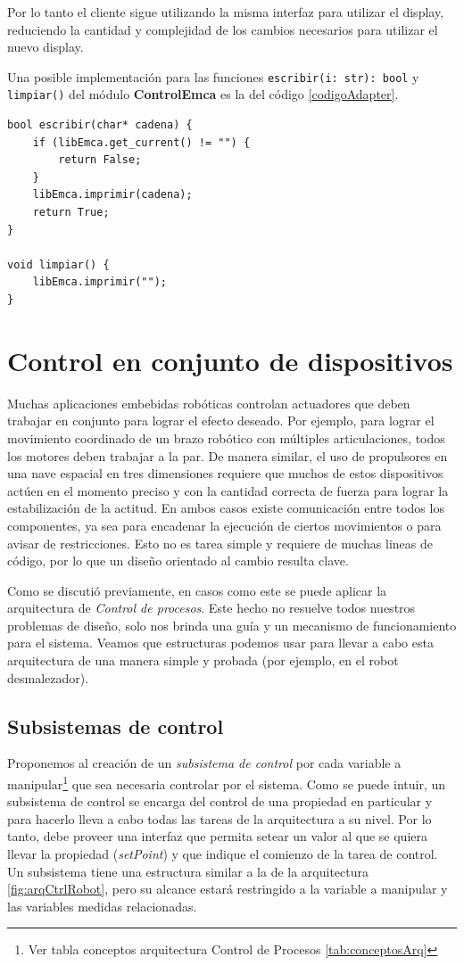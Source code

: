 Por lo tanto el cliente sigue utilizando la misma interfaz para utilizar el display, reduciendo la cantidad y complejidad de los cambios necesarios para utilizar el nuevo display.

Una posible implementación para las funciones \verb|escribir(i: str): bool| y \verb|limpiar()| del módulo \textbf{ControlEmca} es la del código \ref{codigoAdapter}.

\begin{lstlisting}[label={codigoAdapter}, caption=Ejemplo implementación módulo Adapter.]
bool escribir(char* cadena) {
    if (libEmca.get_current() != "") {
        return False;
    }
    libEmca.imprimir(cadena);
    return True;
}

void limpiar() {
    libEmca.imprimir("");
}
\end{lstlisting}

\section{Control en conjunto de dispositivos}
Muchas aplicaciones embebidas robóticas controlan actuadores que deben trabajar en conjunto para lograr el efecto deseado. Por ejemplo, para lograr el movimiento coordinado de un brazo robótico con múltiples articulaciones, todos los motores deben trabajar a la par. De manera similar, el uso de propulsores en una nave espacial en tres dimensiones requiere que muchos de estos dispositivos actúen en el momento preciso y con la cantidad correcta de fuerza para lograr la estabilización de la actitud. En ambos casos existe comunicación entre todos los componentes, ya sea para encadenar la ejecución de ciertos movimientos o para avisar de restricciones. Esto no es tarea simple y requiere de muchas lineas de código, por lo que un diseño orientado al cambio resulta clave.

Como se discutió previamente, en casos como este se puede aplicar la arquitectura de \textit{Control de procesos}. Este hecho no resuelve todos nuestros problemas de diseño, solo nos brinda una guía y un mecanismo de funcionamiento para el sistema. Veamos que estructuras podemos usar para llevar a cabo esta arquitectura de una manera simple y probada (por ejemplo, en el robot desmalezador).

\subsection{Subsistemas de control}

Proponemos al creación de un \textit{subsistema de control} por cada variable a manipular\footnote{Ver tabla conceptos arquitectura Control de Procesos \ref{tab:conceptosArq}} que sea necesaria controlar por el sistema. Como se puede intuir, un subsistema de control se encarga del control de una propiedad en particular y para hacerlo lleva a cabo todas las tareas de la arquitectura a su nivel. Por lo tanto, debe proveer una interfaz que permita setear un valor al que se quiera llevar la propiedad (\textit{setPoint}) y que indique el comienzo de la tarea de control. Un subsistema tiene una estructura similar a la de la arquitectura \ref{fig:arqCtrlRobot}, pero su alcance estará restringido a la variable a manipular y las variables medidas relacionadas.


